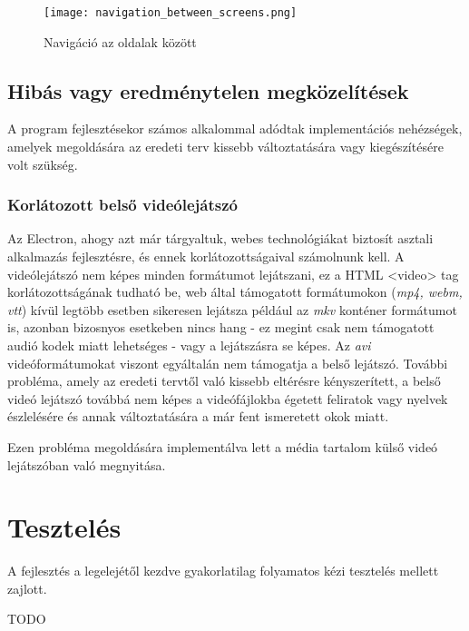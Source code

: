 \begin{figure}[H]
	\centering
	\texttt{[image: navigation\_between\_screens.png]}
	\caption{Navigáció az oldalak között}
	\label{fig:navigation_between_screens}
\end{figure}

\subsection{Hibás vagy eredménytelen megközelítések}
A program fejlesztésekor számos alkalommal adódtak implementációs nehézségek, amelyek megoldására az eredeti terv kissebb változtatására vagy kiegészítésére volt szükség.

\subsubsection{Korlátozott belső videólejátszó}
Az Electron, ahogy azt már tárgyaltuk, webes technológiákat biztosít asztali alkalmazás fejlesztésre, és ennek korlátozottságaival számolnunk kell. A videólejátszó nem képes minden formátumot lejátszani, ez a HTML <video> tag korlátozottságának tudható be, web által támogatott formátumokon ({\it mp4, webm, vtt}) kívül legtöbb esetben sikeresen lejátsza például az {\it mkv} konténer formátumot is, azonban bizosnyos esetkeben nincs hang - ez megint csak nem támogatott audió kodek miatt lehetséges - vagy a lejátszásra se képes. Az {\it avi} videóformátumokat viszont egyáltalán nem támogatja a belső lejátszó.
További probléma, amely az eredeti tervtől való kissebb eltérésre kényszerített, a belső videó lejátszó továbbá nem képes a videófájlokba égetett feliratok vagy nyelvek észlelésére és annak változtatására a már fent ismeretett okok miatt.

Ezen probléma megoldására implementálva lett a média tartalom külső videó lejátszóban való megnyitása.

\section{Tesztelés}
A fejlesztés a legelejétől kezdve gyakorlatilag folyamatos kézi tesztelés mellett zajlott.

TODO
